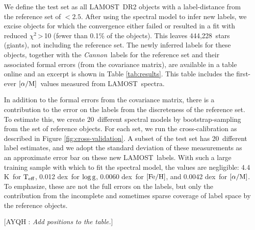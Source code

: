 \documentclass[12pt, letterpaper, preprint]{aastex}
\newcommand{\cannon}{\textsl{Cannon}}
\newcommand{\lamost}{LAMOST}
\newcommand{\teff}{\mbox{$\rm T_{eff}$}}
\newcommand{\feh}{\mbox{$\rm [Fe/H]$}}
\newcommand{\alpham}{\mbox{$\rm [\alpha/M]$}}
\newcommand{\logg}{\mbox{$\rm \log g$}}
\newcommand{\ntestobj}{444,228}
\newcommand{\tefferr}{4.4 K}
\newcommand{\nbssamples}{20}
\newcommand{\loggerr}{0.012 dex}
\newcommand{\feherr}{0.0060 dex}
\newcommand{\afeerr}{0.0042 dex}
\newcommand{\Comment}[2]{ [{\color{red}\sc #1 :} {{\color{cyan} \it #2}}]}
\begin{document}
We define the test set as all \lamost\ DR2 objects with a label-distance from the reference set of $<2.5$.
After using the spectral model to infer new labels,
we excise objects for which the convergence either failed or resulted in a fit with reduced $\chi^2$\,\textgreater\,10 (fewer than 0.1\% of the objects). This leaves \ntestobj\ stars (giants), not including the reference set. 
The newly inferred
labels for these objects, together with the \cannon\ labels for the reference set and their associated formal errors
(from the covariance matrix), are available in a table online and an excerpt is shown in Table \ref{tab:results}. 
This table includes the first-ever \alpham\ values measured from \lamost\ spectra.

In addition to the formal errors from the covariance matrix, there is a contribution to the error on the labels from the discreteness of the reference set. To estimate this, we create \nbssamples\ different spectral models by
bootstrap-sampling from the set of reference objects. For each
set, we run the cross-calibration as described in Figure \ref{fig:cross-validation}. 
A subset of the test set has \nbssamples\ different
label estimates, and we adopt the standard deviation of these measurements as an approximate error bar on these new \lamost\ labels.
With such a large training sample with which to fit the spectral model, the values are negligible: \tefferr\ for \teff, \loggerr\ for \logg, \feherr\ for \feh, and \afeerr\ for \alpham. 
To emphasize, these are not the full errors on the labels, but only the contribution from the incomplete and sometimes sparse coverage of label space by the reference objects. 

\Comment{AYQH}{Add positions to the table.}
\end{document}
